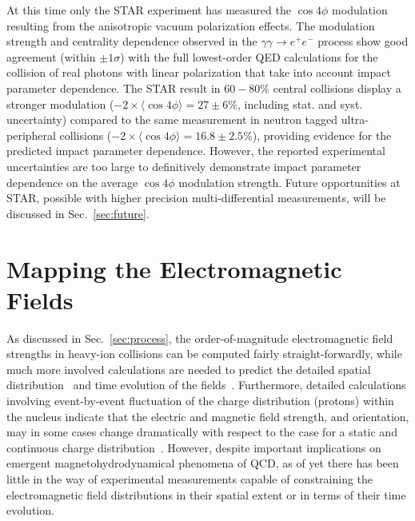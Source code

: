 \documentclass[12pt,epjc3]{svjour3}\sloppy
\begin{document}
At this time only the STAR experiment has measured the $\cos4\phi$ modulation~\cite{starcollaborationMeasurementMomentumAngular2021} resulting from the anisotropic vacuum polarization effects. The modulation strength and centrality dependence observed in the $\gamma\gamma \rightarrow e^+e^-$ process show good agreement (within $\pm1\sigma$) with the full lowest-order QED calculations for the collision of real photons with linear polarization that take into account impact parameter dependence. The STAR result in $60-80\%$ central collisions display a stronger modulation ($-2\times\langle\cos4\phi\rangle = 27\pm6\%$, including stat. and syst. uncertainty) compared to the same measurement in neutron tagged ultra-peripheral collisions ($-2\times\langle\cos4\phi\rangle = 16.8\pm2.5\%$), providing evidence for the predicted impact parameter dependence.
However, the reported experimental uncertainties are too large to definitively demonstrate impact parameter dependence on the average $\cos4\phi$ modulation strength. Future opportunities at STAR, possible with higher precision multi-differential measurements, will be discussed in Sec.~\ref{sec:future}.


\section{Mapping the Electromagnetic Fields}
\label{sec:mapping}
As discussed in Sec.~\ref{sec:process}, the order-of-magnitude electromagnetic field strengths in heavy-ion collisions can be computed fairly straight-forwardly, while much more involved calculations are needed to predict the detailed spatial distribution~\cite{skokovEstimateMagneticField2009} and time evolution of the fields~\cite{mclerranCommentsElectromagneticField2014,kharzeevChiralMagneticConductivity2009}.
Furthermore, detailed calculations involving event-by-event fluctuation of the charge distribution (protons) within the nucleus indicate that the electric and magnetic field strength, and orientation, may in some cases change dramatically with respect to the case for a static and continuous charge distribution~\cite{bzdakEventbyeventFluctuationsMagnetic2012}. 
However, despite important implications on emergent magnetohydrodynamical phenomena of QCD, as of yet there has been little in the way of experimental measurements capable of constraining the electromagnetic field distributions in their spatial extent or in terms of their time evolution.
\end{document}
